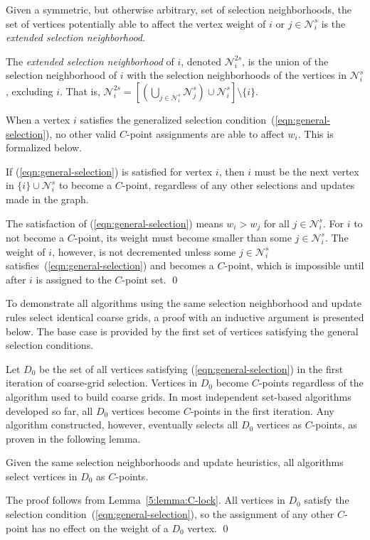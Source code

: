 \documentclass{elsart}
\newenvironment{proof}{\begin{pf}}{\qed\end{pf}}
\begin{document}
Given a symmetric, but otherwise arbitrary, set of selection
neighborhoods, the set of vertices potentially able to affect the
vertex weight of $i$ or $j \in \mathcal{N}_i^s$ is the \emph{extended
selection neighborhood}.
\begin{defn}
The \emph{extended selection neighborhood} of $i$, denoted
$\mathcal{N}_i^{2s}$, is the union of the selection neighborhood of
$i$ with the selection neighborhoods of the vertices in
$\mathcal{N}_i^s$, excluding $i$. That is, $\mathcal{N}_i^{2s} =
\left[\left(\bigcup_{j \in \mathcal{N}_i^s}\mathcal{N}_j^s\right)\cup
\mathcal{N}_i^s\right] \setminus \{i\}$.
\end{defn}

When a vertex $i$ satisfies the generalized selection
condition~(\ref{eqn:general-selection}), no other valid $C$-point
assignments are able to affect $w_i$. This is formalized below.
\begin{lem}
\label{5:lemma:C-lock}
If (\ref{eqn:general-selection}) is satisfied for vertex $i$, then
$i$ must be the next vertex in $\{i\} \cup \mathcal{N}_i^s$ to become
a $C$-point, regardless of any other selections and updates made in
the graph.
\end{lem}
\begin{proof}
The satisfaction of (\ref{eqn:general-selection}) means $w_i > w_j$
for all $j \in \mathcal{N}_i^s$. For $i$ to not become a $C$-point,
its weight must become smaller than some $j \in \mathcal{N}_i^s$. The
weight of $i$, however, is not decremented unless some $j \in
\mathcal{N}_i^s$ satisfies~(\ref{eqn:general-selection}) and becomes
a $C$-point, which is impossible until after $i$ is assigned to the
$C$-point set.
\end{proof}

To demonstrate all algorithms using the same selection neighborhood
and update rules select identical coarse grids, a proof with an
inductive argument is presented below. The base case is provided by
the first set of vertices satisfying the general selection conditions.

Let $D_0$ be the set of all vertices satisfying
(\ref{eqn:general-selection}) in the first iteration of coarse-grid
selection. Vertices in $D_0$ become $C$-points regardless of the
algorithm used to build coarse grids. In most independent set-based
algorithms developed so far, all $D_0$ vertices become $C$-points in
the first iteration. Any algorithm constructed, however, eventually
selects all $D_0$ vertices as $C$-points, as proven in the following
lemma.
\begin{lem}
\label{5:lemma:D0_invariant}
Given the same selection neighborhoods and update heuristics, all
algorithms select vertices in $D_0$ as $C$-points.
\end{lem}
\begin{proof}
The proof follows from Lemma~\ref{5:lemma:C-lock}. All vertices in
$D_0$ satisfy the selection condition~(\ref{eqn:general-selection}),
so the assignment of any other $C$-point has no effect on the weight
of a $D_0$ vertex.
\end{proof}
\end{document}
